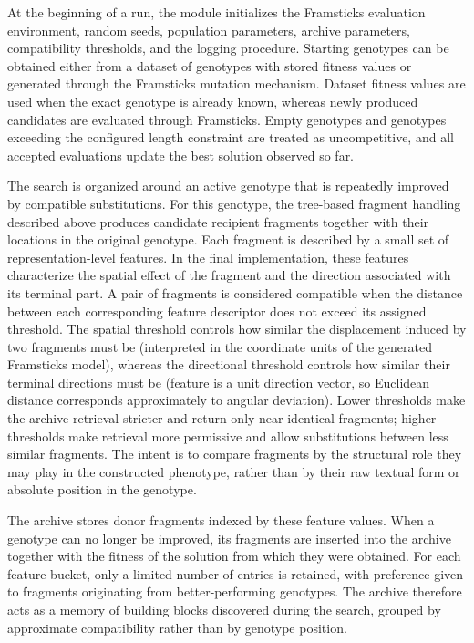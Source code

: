 At the beginning of a run, the module initializes the Framsticks evaluation environment, random seeds, population parameters, archive parameters, compatibility thresholds, and the logging procedure. Starting genotypes can be obtained either from a dataset of \fone{} genotypes with stored fitness values or generated through the Framsticks mutation mechanism. Dataset fitness values are used when the exact genotype is already known, whereas newly produced candidates are evaluated through Framsticks. Empty genotypes and genotypes exceeding the configured length constraint are treated as uncompetitive, and all accepted evaluations update the best solution observed so far.

The search is organized around an active genotype that is repeatedly improved by compatible substitutions. For this genotype, the tree-based fragment handling described above produces candidate recipient fragments together with their locations in the original genotype. Each fragment is described by a small set of representation-level features. In the final \fone{} implementation, these features characterize the spatial effect of the fragment and the direction associated with its terminal part.
A pair of fragments is considered compatible when the distance between each corresponding feature descriptor does not exceed its assigned threshold. The spatial threshold controls how similar the displacement induced by two fragments must be (interpreted in the coordinate units of the generated Framsticks model), whereas the directional threshold controls how similar their terminal directions must be (feature is a unit direction vector, so Euclidean distance corresponds approximately to angular deviation). Lower thresholds make the archive retrieval stricter and return only near-identical fragments; higher thresholds make retrieval more permissive and allow substitutions between less similar fragments.
The intent is to compare fragments by the structural role they may play in the constructed phenotype, rather than by their raw textual form or absolute position in the genotype.

The archive stores donor fragments indexed by these feature values. When a genotype can no longer be improved, its fragments are inserted into the archive together with the fitness of the solution from which they were obtained. For each feature bucket, only a limited number of entries is retained, with preference given to fragments originating from better-performing genotypes. The archive therefore acts as a memory of building blocks discovered during the search, grouped by approximate compatibility rather than by genotype position.

